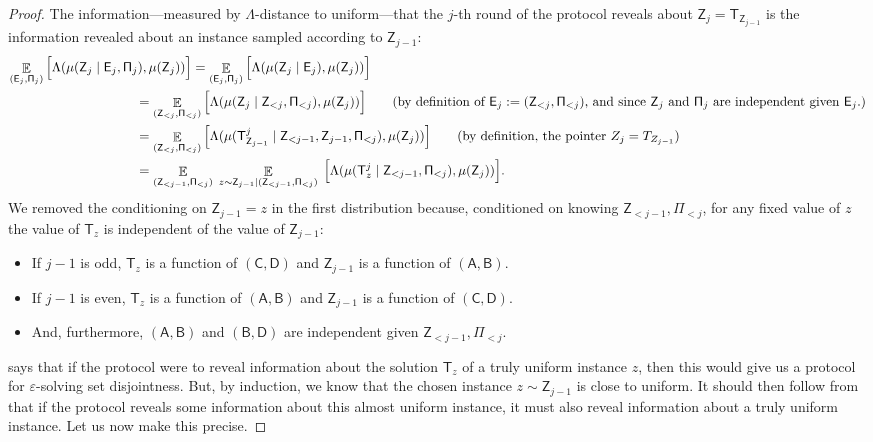 \documentclass[11pt,letterpaper]{article}
\newcommand{\eps}{\varepsilon}
\DeclareMathOperator*{\E}{\mathbb{E}}
\theoremstyle{definition}
\newcommand{\rPi}{\rv{\Pi}}
\newcommand{\Bracket}[1]{\Big[#1\Big]}
\newcommand{\paren}[1]{\ensuremath{\mleft(#1\mright)}\xspace}
\newcommand{\Prot}{\ensuremath{\Pi}}
\newcommand{\rA}{\rv{A}}
\newcommand{\rB}{\rv{B}}
\newcommand{\rC}{\rv{C}}
\newcommand{\rD}{\rv{D}}
\newcommand{\rv}[1]{\ensuremath{\mathsf{#1}}}
\newcommand{\rZ}{\rv{Z}}
\newcommand{\rT}{\rv{T}}
\newcommand{\rE}{\rv{E}}
\newcommand{\rProt}{\rv{\Prot}}
\begin{document}
\begin{proof}
The information---measured by $\Lambda$-distance to uniform---that the $j$-th
round of the protocol reveals about $\rZ_j = \rT_{\rZ_{j-1}}$ is the
information revealed about an instance sampled according to $\rZ_{j-1}$:
  \begin{align*}
		\E_{(\rE_j,\rProt_j)} \Bracket{\Lambda(\mu(\rZ_j \mid
    \rE_j,\rProt_j),\mu(\rZ_j))} &=\E_{(\rE_j,\rProt_j)}
    \Bracket{\Lambda(\mu(\rZ_j \mid \rE_j),\mu(\rZ_j))}\\
		&\hspace{-1.5cm}= \E_{(\rZ_{<j},\rProt_{<j})} \Bracket{\Lambda(\mu(\rZ_j
    \mid \rZ_{<j},\rProt_{<j}),\mu(\rZ_j))} \tag{by definition of
  $\rE_j := (\rZ_{<j},\rProt_{<j})$, and since $\rZ_j$ and $\rPi_j$ are
independent given $\rE_j$.} \\
		&\hspace{-1.5cm}=\E_{(\rZ_{<j},\rProt_{<j})}
    \Bracket{\Lambda(\mu(\rT^j_{\rZ_{j-1}} \mid
    \rZ_{<j-1},\rZ_{j-1},\rProt_{<j}),\mu(\rZ_j))}\tag{by definition, the pointer $Z_j = T_{Z_{j-1}}$}\\
		&\hspace{-1.5cm}= \E_{(\rZ_{<j-1},\rProt_{<j})} \; \E_{z \sim \rZ_{j-1} \mid
    \paren{\rZ_{<j-1},\rProt_{<j}}}\; \Bracket{\Lambda(\mu(\rT^j_{z} \mid
  \rZ_{<j-1},\rProt_{<j}),\mu(\rZ_j))}.
	\end{align*}
  We removed the conditioning on $\rZ_{j-1} = z$ in the first distribution
  because, conditioned on knowing $\rZ_{<j-1},\rProt_{<j}$, for any fixed value of
  $z$ the value of $\rT_{z}$ is independent of the value of $\rZ_{j-1}$:
  \begin{itemize}
	    \item If $j-1$ is odd, $\rT_{z}$ is a function of  $(\rC, \rD)$ and
        $\rZ_{j-1}$ is a function of $(\rA, \rB)$.
            \item If $j-1$ is even, $\rT_{z}$ is a function of $(\rA,\rB)$ and
              $\rZ_{j-1}$ is a function of $(\rC, \rD)$.
            \item And, furthermore, $(\rA,\rB)$ and $(\rB,\rD)$ are independent
              given $\rZ_{<j-1}, \rPi_{<j}$. 
	\end{itemize}

    
	\medskip\noindent
     says that if the protocol were to reveal information
    about the solution $\rT_z$ of a truly uniform instance $z$, then this would
    give us a protocol for $\eps$-solving set disjointness. But, by induction,
    we know that the chosen instance $z \sim \rZ_{j-1}$ is close to uniform. It
    should then follow from  that if the protocol reveals
    some information about this almost uniform instance, it must also reveal
    information about a truly uniform instance. Let us now make this precise.
    

\end{proof}
\end{document}
